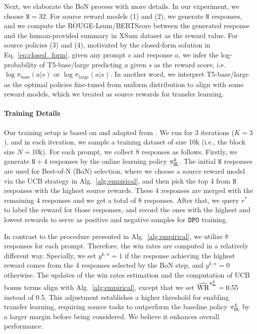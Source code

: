 Next, we elaborate the BoN process with more details.
In our experiment, we choose $\texttt{N}=32$.
For source reward models (1) and (2), we generate $\texttt{N}$ responses, and we compute the ROUGE-Lsum/BERTScore between the generated response and the human-provided summary in XSum dataset as the reward value.
For source policies (3) and (4), motivated by the closed-form solution in Eq.~\eqref{eq:closed_form}, given any prompt $s$ and response $a$, we infer the log-probability of T5-base/large predicting $a$ given $s$ as the reward score, i.e. $\log \pi_{\text{base}}(a|s)$ or $\log \pi_{\text{large}}(a|s)$.
In another word, we interpret T5-base/large as the optimal policies fine-tuned from uniform distribution to align with some reward models, which we treated as source rewards for transfer learning.


\paragraph{Training Details}
Our training setup is based on and adapted from \citep{xiong2024iterative,xie2024exploratory}.
We run for 3 iterations ($K=3$), and in each iteration, we sample a training dataset of size 10k (i.e., the block size $N=$10k). For each prompt, we collect 8 responses as follows.
Firstly, we generate $\texttt{N} + 4$ responses by the online learning policy $\pi^k_{\texttt{OL}}$.
The initial $\texttt{N}$ responses are used for Best-of-N (BoN) selection, where we choose a source reward model via the UCB strategy in Alg.~\ref{alg:empirical}, and then pick the top 4 from $\texttt{N}$ responses with the highest source rewards.
These 4 responses are merged with the remaining 4 responses and we get a total of 8 responses.
After that, we query $r^*$ to label the reward for those responses, and record the ones with the highest and lowest rewards to serve as positive and negative samples for ${\texttt{DPO}}$ training.

In contrast to the procedure presented in Alg.~\ref{alg:empirical}, we utilize 8 responses for each prompt.
Therefore, the win rates are computed in a relatively different way.
Specially, we set $y^{k,n} = 1$ if the response achieving the highest reward comes from the 4 responses selected by the BoN step, and $y^{k,n} = 0$ otherwise.
The updates of the win rates estimation and the computation of UCB bonus terms align with Alg.~\ref{alg:empirical}, except that we set $\widehat{\text{WR}}^{\pi^k_{\texttt{OL}}} = 0.55$ instead of 0.5.
This adjustment establishes a higher threshold for enabling transfer learning, requiring source tasks to outperform the baseline policy $\pi^k_{\texttt{OL}}$ by a larger margin before being considered.
We believe it enhances overall performance.


